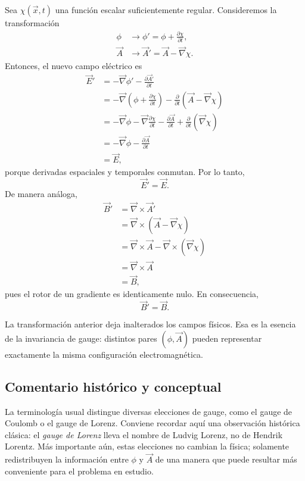 \documentclass[12pt,a4paper]{article}
\theoremstyle{definition}
\theoremstyle{plain}
\numberwithin{equation}{section}
\theoremstyle{remark}
\newcommand{\E}{\vec{E}}
\newcommand{\B}{\vec{B}}
\begin{document}
Sea $\chi(\vec x,t)$ una función escalar suficientemente regular. Consideremos la transformación
\begin{align*}
    \phi &\rightarrow \phi' = \phi + \frac{\partial \chi}{\partial t}, \\
    \vec A &\rightarrow \vec A' = \vec A - \vec\nabla\chi.
\end{align*}
Entonces, el nuevo campo eléctrico es
\begin{align*}
    \E' &= -\vec\nabla \phi' - \frac{\partial \vec A'}{\partial t} \\
    &= -\vec\nabla\left(\phi + \frac{\partial \chi}{\partial t}\right) - \frac{\partial}{\partial t}\left(\vec A - \vec\nabla\chi\right) \\
    &= -\vec\nabla\phi - \vec\nabla\frac{\partial \chi}{\partial t} - \frac{\partial \vec A}{\partial t} + \frac{\partial}{\partial t}\left(\vec\nabla\chi\right) \\
    &= -\vec\nabla\phi - \frac{\partial \vec A}{\partial t} \\
    &= \E,
\end{align*}
porque derivadas espaciales y temporales conmutan. Por lo tanto,
\begin{equation*}
    \E' = \E.
\end{equation*}
De manera análoga,
\begin{align*}
    \B' &= \vec\nabla\times\vec A' \\
    &= \vec\nabla\times\left(\vec A - \vec\nabla\chi\right) \\
    &= \vec\nabla\times\vec A - \vec\nabla\times\left(\vec\nabla\chi\right) \\
    &= \vec\nabla\times\vec A \\
    &= \B,
\end{align*}
pues el rotor de un gradiente es identicamente nulo. En consecuencia,
\begin{equation*}
    \B' = \B.
\end{equation*}

La transformación anterior deja inalterados los campos físicos. Esa es la esencia de la invariancia de gauge: distintos pares $(\phi,\vec A)$ pueden representar exactamente la misma configuración electromagnética.

\subsection*{Comentario histórico y conceptual}
La terminología usual distingue diversas elecciones de gauge, como el gauge de Coulomb o el gauge de Lorenz. Conviene recordar aquí una observación histórica clásica: el \emph{gauge de Lorenz} lleva el nombre de Ludvig Lorenz, no de Hendrik Lorentz. Más importante aún, estas elecciones no cambian la física; solamente redistribuyen la información entre $\phi$ y $\vec A$ de una manera que puede resultar más conveniente para el problema en estudio.
\end{document}

